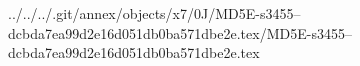 ../../../.git/annex/objects/x7/0J/MD5E-s3455--dcbda7ea99d2e16d051db0ba571dbe2e.tex/MD5E-s3455--dcbda7ea99d2e16d051db0ba571dbe2e.tex